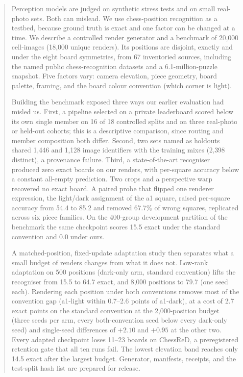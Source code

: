 \begin{abstract}
Perception models are judged on synthetic stress tests and on small real-photo sets. Both can
mislead. We use chess-position recognition as a testbed, because ground truth is exact and one
factor can be changed at a time. We describe a controlled render generator and a benchmark of
20{,}000 cell-images (18{,}000 unique renders). Its positions are disjoint, exactly and under the
eight board symmetries, from 67 inventoried sources, including the named public chess-recognition
datasets and a 6.1-million-puzzle snapshot. Five factors vary: camera elevation, piece
geometry, board palette, framing, and the board colour convention (which corner is light).

Building the benchmark exposed three ways our earlier evaluation had misled us. First, a pipeline
selected on a private leaderboard scored below its own single member on 16 of 18 controlled
splits and on three real-photo or held-out cohorts; this is a descriptive comparison, since routing
and member composition both differ. Second, two sets named as holdouts shared 1{,}446 and 1{,}128 image
identifiers with the training mixes (2{,}398 distinct), a provenance failure. Third, a state-of-the-art recogniser produced zero exact
boards on our renders, with per-square accuracy below a constant all-empty prediction. Two crops
and a perspective warp recovered no exact board. A paired probe that flipped one renderer
expression, the light/dark assignment of the a1 square, raised per-square accuracy from 54.4 to
85.2 and removed 67.7\% of wrong squares, replicated across six piece families. On the 400-group
development partition of the benchmark the same checkpoint scores 15.5 exact under the standard
convention and 0.0 under ours.

A matched-position, fixed-update adaptation study then separates what a small budget of renders
changes from what it does not. Low-rank adaptation on 500 positions (dark-only arm, standard convention) lifts the recogniser
from 15.5 to 64.7 exact, and 8{,}000 positions to 79.7 (one seed each). Rendering each position under both conventions
removes most of the convention gap (a1-light within 0.7--2.6 points of a1-dark), at a cost of 2.7 exact points on the standard convention at the
2{,}000-position budget (three seeds per arm, every both-convention seed below every dark-only
seed) and single-seed differences of $+2.10$ and $+0.95$ at the other two. Every adapted
checkpoint loses 11--23 boards on ChessReD, a preregistered retention gate that all ten runs fail.
The lowest elevation band reaches only 14.5 exact after the largest budget. Generator, manifests,
receipts, and the test-split hash list are prepared for release.
\end{abstract}
